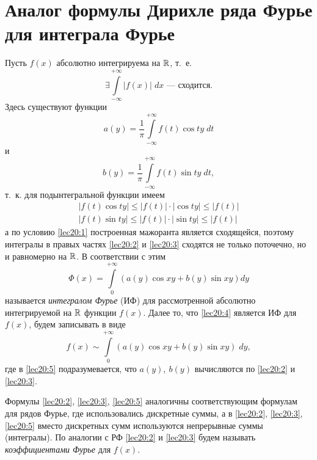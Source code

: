 \documentclass[../../main.tex]{subfiles}
\begin{document}
\section{Аналог формулы Дирихле ряда Фурье для интеграла Фурье}

Пусть $ f(x) $ абсолютно интегрируема на $ \mathbb{R} $, т.~е.
\begin{equation}
\label{lec20:1}
\exists \int\limits_{-\infty}^{+\infty} |f(x)|\;dx \text{~--- сходится.}
\end{equation}
Здесь существуют функции
\begin{equation}
\label{lec20:2}
a(y) = \dfrac{1}{\pi} \int\limits_{-\infty}^{+\infty} 
f(t) \cos ty\;dt
\end{equation}
и
\begin{equation}
\label{lec20:3}
b(y) = \dfrac{1}{\pi} \int\limits_{-\infty}^{+\infty}
f(t) \sin ty\;dt,
\end{equation}
т.~к. для подынтегральной функции имеем
\[
\begin{gathered}
|f(t) \cos ty| \leq |f(t)|\cdot|\cos ty| \leq |f(t)|\\
|f(t) \sin ty| \leq |f(t)|\cdot|\sin ty| \leq |f(t)|
\end{gathered}
\]
а по условию \eqref{lec20:1} построенная мажоранта является сходящейся,
поэтому интегралы в правых частях \eqref{lec20:2} и \eqref{lec20:3}
сходятся не только поточечно, но и равномерно на $ \mathbb{R} $.
В соответствии с этим 
\begin{equation}
\label{lec20:4}
\Phi(x) = \int\limits_0^{+\infty} \left(
a(y) \cos xy + b(y) \sin xy
\right) dy
\end{equation}
называется \emph{интегралом Фурье} (ИФ) для рассмотренной
абсолютно интегрируемой на $ \mathbb{R} $ функции $ f(x) $.
Далее то, что \eqref{lec20:4} является ИФ для $ f(x) $, будем записывать в 
виде
\begin{equation}
\label{lec20:5}
f(x) \sim \int\limits_0^{+\infty} \left(
a(y) \cos xy + b(y) \sin xy
\right) \; dy,
\end{equation}
где в \eqref{lec20:5} подразумевается, что $ a(y),\ b(y) $ вычисляются по 
\eqref{lec20:2} и \eqref{lec20:3}.

Формулы \eqref{lec20:2}, \eqref{lec20:3}, \eqref{lec20:5} аналогичны
соответствующим формулам для рядов Фурье, где 
использовались дискретные суммы, а в 
\eqref{lec20:2}, \eqref{lec20:3}, \eqref{lec20:5}
вместо дискретных сумм используются непрерывные суммы (интегралы).
По аналогии с РФ \eqref{lec20:2} и \eqref{lec20:3} будем называть 
\emph{коэффициентами Фурье} для $ f(x) $.
\end{document}
